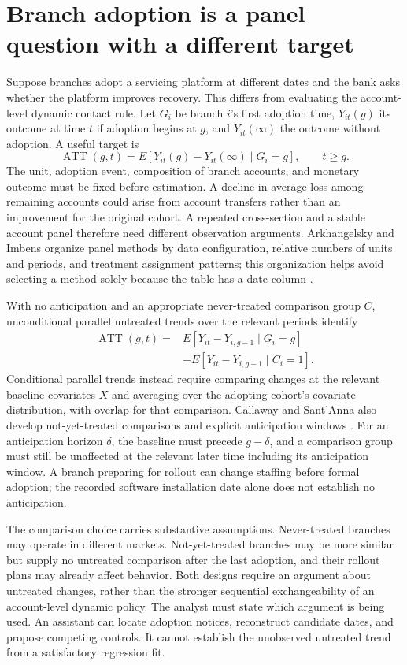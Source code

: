 \section{Branch adoption is a panel question with a different target}
\label{exec14:l5-panel}

Suppose branches adopt a servicing platform at different dates and the bank
asks whether the platform improves recovery. This differs from evaluating the
account-level dynamic contact rule. Let $G_i$ be branch $i$'s first adoption
time, $Y_{it}(g)$ its outcome at time $t$ if adoption begins at $g$, and
$Y_{it}(\infty)$ the outcome without adoption. A useful target is
\[
 \operatorname{ATT}(g,t)
 =E[Y_{it}(g)-Y_{it}(\infty)\mid G_i=g],\qquad t\geq g.
\]
The unit, adoption event, composition of branch accounts, and monetary outcome
must be fixed before estimation. A decline in average loss among remaining
accounts could arise from account transfers rather than an improvement for
the original cohort. A repeated cross-section and a stable account panel
therefore need different observation arguments. Arkhangelsky and Imbens
organize panel methods by data configuration, relative numbers of units and
periods, and treatment assignment patterns; this organization helps avoid
selecting a method solely because the table has a date column
\cite{panelreview2024}.

With no anticipation and an appropriate never-treated comparison group $C$,
unconditional parallel untreated trends over the relevant periods identify
\begin{align*}
 \operatorname{ATT}(g,t)
 ={}&E[Y_{it}-Y_{i,g-1}\mid G_i=g]\\
 &-E[Y_{it}-Y_{i,g-1}\mid C_i=1].
\end{align*}
Conditional parallel trends instead require comparing changes at the relevant
baseline covariates $X$ and averaging over the adopting cohort's covariate
distribution, with overlap for that comparison. Callaway and Sant'Anna also
develop not-yet-treated comparisons and explicit anticipation windows
\cite{callaway2021}. For an anticipation horizon $\delta$, the baseline must
precede $g-\delta$, and a comparison group must still be unaffected at the
relevant later time including its anticipation window. A branch preparing for
rollout can change staffing before formal adoption; the recorded software
installation date alone does not establish no anticipation.

The comparison choice carries substantive assumptions. Never-treated branches
may operate in different markets. Not-yet-treated branches may be more similar
but supply no untreated comparison after the last adoption, and their rollout
plans may already affect behavior. Both designs require an argument about
untreated changes, rather than the stronger sequential exchangeability of an
account-level dynamic policy. The analyst must state which argument is being
used. An assistant can locate adoption notices, reconstruct candidate dates,
and propose competing controls. It cannot establish the unobserved untreated
trend from a satisfactory regression fit.

